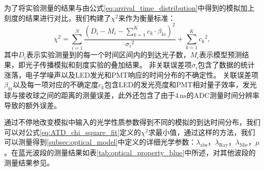 为了将实验测量的结果与由公式\ref{eq:arrival_time_distribution}中得到的模拟加上刻度的结果进行对比，我们构建了$\chi^2$来作为衡量标准：
\begin{equation}
    {\chi}^2 = \sum_{i=1}^{N}{ \frac{ ( D_i - M_i - \sum_{k=1}^{K}{ c_k \cdot \beta_{ki} } )^2 }{ {\sigma_i}^2 } } + \sum_{k=1}^{K}{ {c_k}^2 } , 
    \label{eq:ATD_chi_square_fit}
\end{equation}
其中$D_i$表示实验测量到的每一个时间区间内的到达光子数，$M_i$表示模型预测结果，即光子传播模拟和刻度实验的叠加结果。
非关联误差项$\sigma_i$包含了数据的统计涨落，电子学噪声以及LED发光和PMT响应的时间分布的不确定性。
关联误差项$\beta_{ki}$以及每一项对应的不确定度$c_k$包含LED的发光亮度和PMT相对量子效率，发光球与接收球之间的距离的测量误差，此外还包含了由于$4\,\text{ns}$的ADC测量时间分辨率导致的额外误差。

通过不停地改变模拟中输入的光学性质参数得到不同的模拟的到达时间分布，我们可以对公式\ref{eq:ATD_chi_square_fit}定义的${\chi}^2$求最小值，通过这样的方法，我们可以测量得到\ref{subsec:optical_model}中定义的详细光学参数：$\lambda_\mathrm{abs}$，$\lambda_\mathrm{Ray}$，$\lambda_\mathrm{Mie}$，$\mu$。在蓝光波段的测量结果如表\ref{tab:optical_property_blue}中所述，对其他波段的测量结果参见\cite{TRIDENT_pathfinder:2022}。

